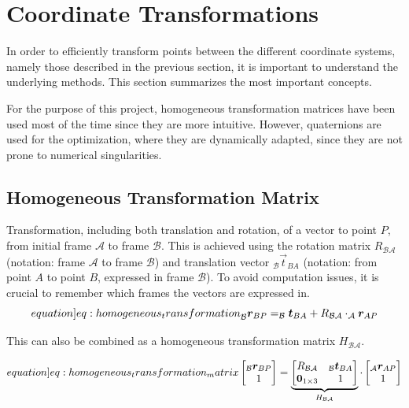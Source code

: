 \section{Coordinate Transformations}
\label{sec:coordinate_transformations}

In order to efficiently transform points between the different coordinate systems, namely those described in the previous section, it is important to understand the underlying methods. This section summarizes the most important concepts.

For the purpose of this project, homogeneous transformation matrices have been used most of the time since they are more intuitive. However, quaternions are used for the optimization, where they are dynamically adapted, since they are not prone to numerical singularities.

\subsection{Homogeneous Transformation Matrix}

Transformation, including both translation and rotation, of a vector to point $P$, from initial frame $\mathcal A$ to frame $\mathcal B$. This is achieved using the rotation matrix $R_{\mathcal B \mathcal A}$ (notation: frame $\mathcal A$ to frame $\mathcal B$) and translation vector $_\mathcal B \vec t_{BA}$ (notation: from point $A$ to point $B$, expressed in frame $\mathcal B$). To avoid computation issues, it is crucial to remember which frames the vectors are expressed in.
\begin{equation}
    \label[equation]{eq:homogeneous_transformation}
    _\mathcal B \vec r_{BP} = _\mathcal B \vec t_{BA} + R_{\mathcal B \mathcal A} \cdot _\mathcal A \vec r_{AP}
\end{equation}


This can also be combined as a homogeneous transformation matrix $H_{\mathcal B \mathcal A}$.

\begin{equation}
    \label[equation]{eq:homogeneous_transformation_matrix}
    \begin{bmatrix} _\mathcal B \vec r_{BP} \\ 1 \end{bmatrix} = \underbrace{\begin{bmatrix} R_{\mathcal B \mathcal A} & _\mathcal B \vec t_{BA} \\ \vec 0_{1\times 3} & 1 \end{bmatrix}}_{H_{\mathcal B \mathcal A}} \cdot \begin{bmatrix} _\mathcal A \vec r_{AP} \\ 1 \end{bmatrix}
\end{equation}

